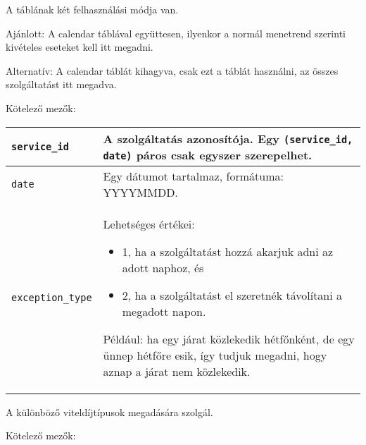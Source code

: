 
A táblának két felhasználási módja van.

Ajánlott: A calendar táblával együttesen, ilyenkor a normál menetrend szerinti kivételes eseteket kell itt megadni.

Alternatív: A calendar táblát kihagyva, csak ezt a táblát használni, az összes szolgáltatást itt megadva. 

\medskip

\noindent Kötelező mezők:

\bigskip

\begin{tabular}{|p{3.5cm}|p{10cm}|}
\hline
\texttt{service\_id} & A szolgáltatás azonosítója. Egy \texttt{(service\_id, date)} páros csak egyszer szerepelhet. \\
\hline
\texttt{date} & Egy dátumot tartalmaz, formátuma: YYYYMMDD. \\
\hline
\texttt{exception\_type} & Lehetséges értékei:
\begin{itemize}
\item 1, ha a szolgáltatást hozzá akarjuk adni az adott naphoz, és
\item 2, ha a szolgáltatást el szeretnék távolítani a megadott napon.
\end{itemize}
Például: ha egy járat közlekedik hétfőnként, de egy ünnep hétfőre esik, így tudjuk megadni, hogy aznap a járat nem közlekedik. \\
\hline
\end{tabular}


A különböző viteldíjtípusok megadására szolgál.

\medskip

\noindent Kötelező mezők:

\bigskip

